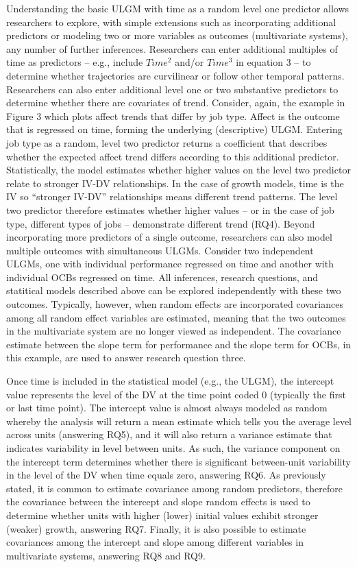 \documentclass[english,,man]{apa6}
\begin{document}
Understanding the basic ULGM with time as a random level one predictor allows researchers to explore, with simple extensions such as incorporating additional predictors or modeling two or more variables as outcomes (multivariate systems), any number of further inferences. Researchers can enter additional multiples of time as predictors -- e.g., include \(Time^2\) and/or \(Time^3\) in equation 3 -- to determine whether trajectories are curvilinear or follow other temporal patterns. Researchers can also enter additional level one or two substantive predictors to determine whether there are covariates of trend. Consider, again, the example in Figure 3 which plots affect trends that differ by job type. Affect is the outcome that is regressed on time, forming the underlying (descriptive) ULGM. Entering job type as a random, level two predictor returns a coefficient that describes whether the expected affect trend differs according to this additional predictor. Statistically, the model estimates whether higher values on the level two predictor relate to stronger IV-DV relationships. In the case of growth models, time is the IV so \enquote{stronger IV-DV} relationships means different trend patterns. The level two predictor therefore estimates whether higher values -- or in the case of job type, different types of jobs -- demonstrate different trend (RQ4). Beyond incorporating more predictors of a single outcome, researchers can also model multiple outcomes with simultaneous ULGMs. Consider two independent ULGMs, one with individual performance regressed on time and another with individual OCBs regressed on time. All inferences, research questions, and statitical models described above can be explored independently with these two outcomes. Typically, however, when random effects are incorporated covariances among all random effect variables are estimated, meaning that the two outcomes in the multivariate system are no longer viewed as independent. The covariance estimate between the slope term for performance and the slope term for OCBs, in this example, are used to answer research question three.

Once time is included in the statistical model (e.g., the ULGM), the intercept value represents the level of the DV at the time point coded 0 (typically the first or last time point). The intercept value is almost always modeled as random whereby the analysis will return a mean estimate which tells you the average level across units (answering RQ5), and it will also return a variance estimate that indicates variability in level between units. As such, the variance component on the intercept term determines whether there is significant between-unit variability in the level of the DV when time equals zero, answering RQ6. As previously stated, it is common to estimate covariance among random predictors, therefore the covariance between the intercept and slope random effects is used to determine whether units with higher (lower) initial values exhibit stronger (weaker) growth, answering RQ7. Finally, it is also possible to estimate covariances among the intercept and slope among different variables in multivariate systems, answering RQ8 and RQ9.
\end{document}
